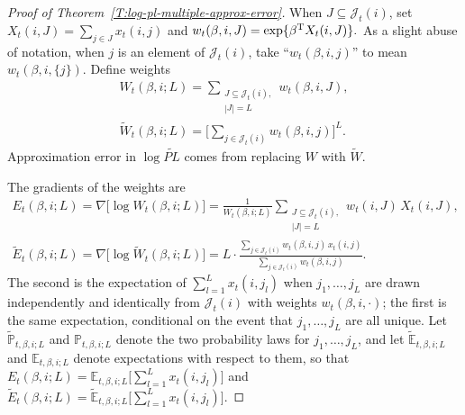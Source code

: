 \documentclass[aoas,preprint]{imsart}
\begin{document}
\begin{proof}[Proof of Theorem~\ref{T:log-pl-multiple-approx-error}]

When $J \subseteq \mathcal{J}_t(i)$, set
\(
    X_t(i, J) = \sum_{j \in J} x_t(i,j)
\)
and
\(
    w_t(\beta, i, J)
        = \exp\{ \beta^{\mathrm{T}} X_t(i,J) \}.
\)
As a slight abuse of notation, when $j$ is an element of $\mathcal{J}_t(i)$,
take ``$w_t(\beta, i, j)$'' to mean $w_t(\beta, i, \{j\})$.  Define weights
\begin{subequations}
\begin{gather*}
    W_t(\beta, i; L)
        = \sum_{\substack{J \subseteq \mathcal{J}_t(i), \\
                          |J| = L}}
              w_t(\beta,i,J), \\
    \widetilde W_t(\beta, i; L)
        =
            \Big[ \sum_{j \in \mathcal{J}_t(i)} w_t(\beta, i, j) \Big]^L.
\end{gather*}
\end{subequations}
Approximation error in $\log \widetilde{\mathit{PL}}$ comes from replacing
$W$ with $\widetilde W$.

The gradients of the weights are
\begin{subequations}
\begin{gather*}
    E_t(\beta, i; L)
        = \nabla \big[ \log W_t(\beta, i; L) \big]
        =
        \frac{1}{W_t(\beta, i; L)}
        \sum_{\substack{J \subseteq \mathcal{J}_t(i), \\
                        |J| = L}}\!
            w_t(i,J)
            \,
            X_t(i,J), \\
    \widetilde E_t(\beta, i; L)
        = \nabla \big[ \log \widetilde W_t(\beta, i; L) \big]
        =
        L
        \cdot
        \frac{
            \sum_{j \in \mathcal{J}_t(i)}
                w_t(\beta, i, j) \, x_t(i,j)
        }{
            \sum_{j \in \mathcal{J}_t(i)}
                w_t(\beta, i, j)
        }.
\end{gather*}
\end{subequations}
The second is the expectation of $\sum_{l = 1}^L x_t(i, j_l)$ when
$j_1, \ldots, j_L$ are drawn independently and identically from
$\mathcal{J}_t(i)$ with weights $w_t(\beta, i, \cdot)$; the first is the same
expectation, conditional on the event that $j_1, \ldots, j_L$ are all unique.
Let $\tilde{\mathbb{P}}_{t,\beta,i;L}$ and $\mathbb{P}_{t,\beta,i;L}$
denote the two probability laws for $j_1, \ldots, j_L$, and let
$\tilde{\mathbb{E}}_{t,\beta,i;L}$ and $\mathbb{E}_{t,\beta,i;L}$ denote
expectations with respect to them, so that
$E_t(\beta,i;L) = \mathbb{E}_{t,\beta,i;L} \big[ \sum_{l=1}^L x_t(i,j_l)\big]$
and
\(
    \widetilde E_t(\beta,i;L)
    =
    \tilde{\mathbb{E}}_{t,\beta,i;L} \big[ \sum_{l=1}^L x_t(i,j_l)\big].
\)


\end{proof}
\end{document}
